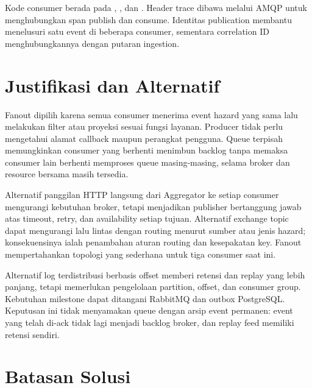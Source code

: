 Kode consumer berada pada
,
, dan
.
Header trace dibawa melalui AMQP untuk menghubungkan span publish dan
consume. Identitas publication membantu menelusuri satu event di beberapa
consumer, sementara correlation ID menghubungkannya dengan putaran ingestion.

\section{Justifikasi dan Alternatif}

Fanout dipilih karena semua consumer menerima event hazard yang sama lalu
melakukan filter atau proyeksi sesuai fungsi layanan. Producer tidak perlu
mengetahui alamat callback maupun perangkat pengguna. Queue terpisah
memungkinkan consumer yang berhenti menimbun backlog tanpa memaksa consumer
lain berhenti memproses queue masing-masing, selama broker dan resource
bersama masih tersedia.

Alternatif panggilan HTTP langsung dari Aggregator ke setiap consumer
mengurangi kebutuhan broker, tetapi menjadikan publisher bertanggung jawab
atas timeout, retry, dan availability setiap tujuan. Alternatif exchange
topic dapat mengurangi lalu lintas dengan routing menurut sumber atau jenis
hazard; konsekuensinya ialah penambahan aturan routing dan kesepakatan key.
Fanout mempertahankan topologi yang sederhana untuk tiga consumer saat ini.

Alternatif log terdistribusi berbasis offset memberi retensi dan replay
yang lebih panjang, tetapi memerlukan pengelolaan partition, offset, dan
consumer group. Kebutuhan milestone dapat ditangani RabbitMQ dan outbox
PostgreSQL. Keputusan ini tidak menyamakan queue dengan arsip event permanen:
event yang telah di-ack tidak lagi menjadi backlog broker, dan replay feed
memiliki retensi sendiri.

\section{Batasan Solusi}

